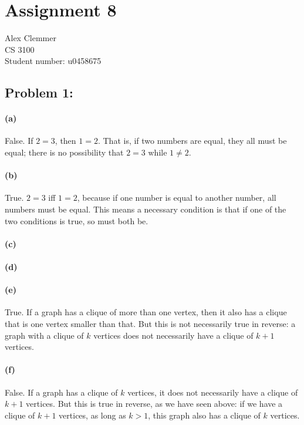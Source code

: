 \documentclass[a4paper]{article}
\begin{document}
\section*{Assignment 8}
Alex Clemmer\\
CS 3100 \\
Student number: u0458675

\subsection*{Problem 1:} 

\paragraph{(a)} False. If $2=3$, then $1=2$. That is, if two numbers are equal, they all must be equal; there is no possibility that $2=3$ while $1 \neq 2$.

\paragraph{(b)} True. $2=3$ iff $1=2$, because if one number is equal to another number, all numbers must be equal. This means a necessary condition is that if one of the two conditions is true, so must both be.

\paragraph{(c)} 

\paragraph{(d)} 

\paragraph{(e)} True. If a graph has a clique of more than one vertex, then it also has a clique that is one vertex smaller than that. But this is not necessarily true in reverse: a graph with a clique of $k$ vertices does not necessarily have a clique of $k+1$ vertices.

\paragraph{(f)} False. If a graph has a clique of $k$ vertices, it does not necessarily have a clique of $k+1$ vertices. But this is true in reverse, as we have seen above: if we have a clique of $k+1$ vertices, as long as $k>1$, this graph also has a clique of $k$ vertices.
\end{document}
